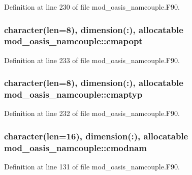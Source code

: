 Definition at line 230 of file mod\+\_\+oasis\+\_\+namcouple.\+F90.

\hypertarget{classmod__oasis__namcouple_a3d7b34ed13d4ad8f86bbab3ad9956b6b}{
\subsubsection[{cmapopt}]{\setlength{\rightskip}{0pt plus 5cm}character(len=8), dimension(\+:), allocatable mod\+\_\+oasis\+\_\+namcouple\+::cmapopt\hspace{0.3cm}{\ttfamily [private]}}}\label{classmod__oasis__namcouple_a3d7b34ed13d4ad8f86bbab3ad9956b6b}


Definition at line 233 of file mod\+\_\+oasis\+\_\+namcouple.\+F90.

\hypertarget{classmod__oasis__namcouple_a82b32aa4c78713443daf65a3dfbc75dc}{
\subsubsection[{cmaptyp}]{\setlength{\rightskip}{0pt plus 5cm}character(len=8), dimension(\+:), allocatable mod\+\_\+oasis\+\_\+namcouple\+::cmaptyp\hspace{0.3cm}{\ttfamily [private]}}}\label{classmod__oasis__namcouple_a82b32aa4c78713443daf65a3dfbc75dc}


Definition at line 232 of file mod\+\_\+oasis\+\_\+namcouple.\+F90.

\hypertarget{classmod__oasis__namcouple_af655140b07f24b508df7244f8103c670}{
\subsubsection[{cmodnam}]{\setlength{\rightskip}{0pt plus 5cm}character(len=16), dimension(\+:), allocatable mod\+\_\+oasis\+\_\+namcouple\+::cmodnam\hspace{0.3cm}{\ttfamily [private]}}}\label{classmod__oasis__namcouple_af655140b07f24b508df7244f8103c670}


Definition at line 131 of file mod\+\_\+oasis\+\_\+namcouple.\+F90.

